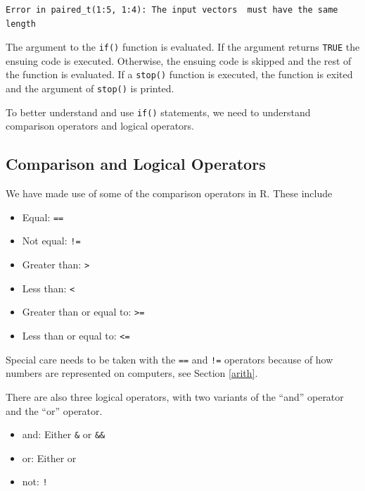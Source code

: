 \documentclass[]{krantz}
\providecommand{\tightlist}{%
  \setlength{\itemsep}{0pt}\setlength{\parskip}{0pt}}
\begin{document}
\begin{verbatim}
Error in paired_t(1:5, 1:4): The input vectors  must have the same length
\end{verbatim}

The argument to the \texttt{if()} function is evaluated. If the argument returns \texttt{TRUE} the ensuing code is executed. Otherwise, the ensuing code is skipped and the rest of the function is evaluated. If a \texttt{stop()} function is executed, the function is exited and the argument of \texttt{stop()} is printed.

To better understand and use \texttt{if()} statements, we need to understand comparison operators and logical operators.

\hypertarget{comparison-and-logical-operators}{%
\subsection{Comparison and Logical Operators}\label{comparison-and-logical-operators}}

We have made use of some of the comparison operators in R. These include

\begin{itemize}
\tightlist
\item
  Equal: \texttt{==}
\item
  Not equal: \texttt{!=}
\item
  Greater than: \texttt{\textgreater{}}
\item
  Less than: \texttt{\textless{}}
\item
  Greater than or equal to: \texttt{\textgreater{}=}
\item
  Less than or equal to: \texttt{\textless{}=}
\end{itemize}

Special care needs to be taken with the \texttt{==} and \texttt{!=} operators because of how numbers are represented on computers, see Section \ref{arith}.

There are also three logical operators, with two variants of the ``and'' operator and the ``or'' operator.

\begin{itemize}
\tightlist
\item
  and: Either \texttt{\&} or \texttt{\&\&}
\item
  or: Either \texttt{\textbar{}} or \texttt{\textbar{}\textbar{}}
\item
  not: \texttt{!}
\end{itemize}
\end{document}

